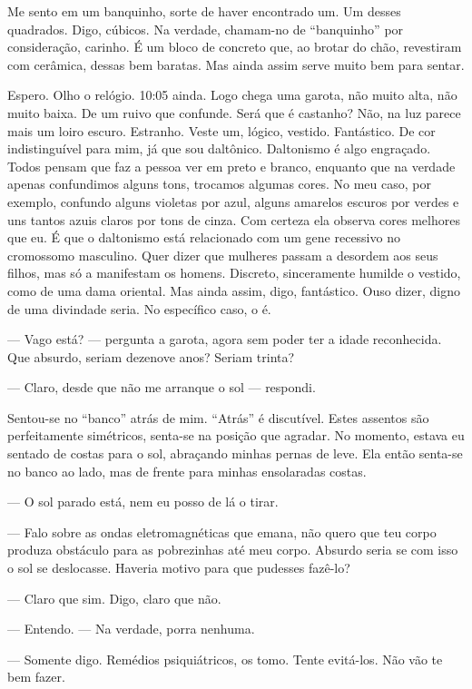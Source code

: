 Me sento em um banquinho, sorte de haver encontrado um. Um desses quadrados. Digo, cúbicos. Na verdade, cha\-mam-no de ``banquinho'' por consideração, carinho. É um bloco de concreto que, ao brotar do chão, revestiram com cerâmica, dessas bem baratas. Mas ainda assim serve muito bem para sentar.

Espero. Olho o relógio. 10:05 ainda. Logo chega uma garota, não muito alta, não muito baixa. De um ruivo que confunde. Será que é castanho? Não, na luz parece mais um loiro escuro. Estranho. Veste um, lógico, vestido. Fantástico. De cor indistinguível para mim, já que sou daltônico. Daltonismo é algo engraçado. Todos pensam que faz a pessoa ver em preto e branco, enquanto que na verdade apenas confundimos alguns tons, trocamos algumas cores. No meu caso, por exemplo, confundo alguns violetas por azul, alguns amarelos escuros por verdes e uns tantos azuis claros por tons de cinza. Com certeza ela observa cores melhores que eu. É que o daltonismo está relacionado com um gene recessivo no cromossomo masculino. Quer dizer que mulheres passam a desordem aos seus filhos, mas só a manifestam os homens. Discreto, sinceramente humilde o vestido, como de uma dama oriental. Mas ainda assim, digo, fantástico. Ouso dizer, digno de uma divindade seria. No específico caso, o é.

--- Vago está? --- pergunta a garota, agora sem poder ter a idade reconhecida. Que absurdo, seriam dezenove anos? Seriam trinta?

--- Claro, desde que não me arranque o sol --- respondi.

Sentou-se no ``banco'' atrás de mim. ``Atrás'' é discutível. Estes assentos são perfeitamente simétricos, senta-se na posição que agradar. No momento, estava eu sentado de costas para o sol, abraçando minhas pernas de leve. Ela então senta-se no banco ao lado, mas de frente para minhas ensolaradas costas.

--- O sol parado está, nem eu posso de lá o tirar.

--- Falo sobre as ondas eletromagnéticas que emana, não quero que teu corpo produza obstáculo para as pobrezinhas até meu corpo. Absurdo seria se com isso o sol se deslocasse. Haveria motivo para que pudesses fazê-lo?

--- Claro que sim. Digo, claro que não.

--- Entendo. --- Na verdade, porra nenhuma.

--- Somente digo. Remédios psiquiátricos, os tomo. Tente evitá-los. Não vão te bem fazer.

